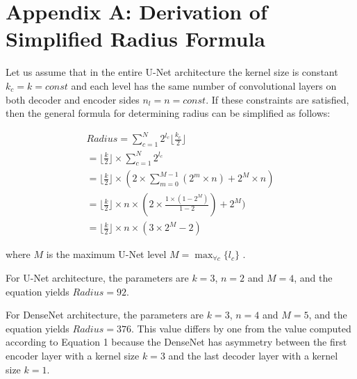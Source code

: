 %
%
%
%
%
%


\section{Appendix A: Derivation of Simplified Radius Formula}

Let us assume that in the entire U-Net architecture the kernel size is constant $k_{c} = k = const$ and each level has the same number of convolutional layers on both decoder and encoder sides $n_{l} = n = const$. If these constraints are satisfied, then the general formula for determining radius can be simplified as follows:

\begin{equation}
\begin{aligned}
Radius = \sum_{c=1}^{N} 2^{l_c} \lfloor \frac{k_c}{2} \rfloor \\
= \lfloor \frac{k}{2} \rfloor \times \sum_{c=1}^{N} 2^{l_c} \\
= \lfloor \frac{k}{2} \rfloor \times ( 2 \times \sum_{m=0}^{M-1} (2^{m} \times n) + 2^{M} \times n )  \\
= \lfloor \frac{k}{2} \rfloor \times n \times ( 2 \times \frac{1 \times (1 - 2^M) }{ 1- 2} ) + 2^{M} )  \\
= \lfloor \frac{k}{2} \rfloor \times n \times (3 \times 2^{M} - 2) 
\end{aligned}
\end{equation}

where $M$ is the maximum U-Net level $M = \max_{\forall c}\{ l_{c} \}$ .

For U-Net architecture, the parameters are $k = 3$, $n=2$ and $M=4$, and the equation yields $Radius=92$.

For DenseNet architecture, the parameters are $k = 3$, $n=4$ and $M=5$, and the equation yields $Radius=376$. This value differs by one from the value computed according to Equation 1 because the DenseNet has asymmetry between the first encoder layer with a kernel size $k = 3$ and the last decoder layer with a kernel size $k = 1$.   



